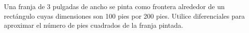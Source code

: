 \item Una franja de 3 pulgadas de ancho se pinta como frontera alrededor de un rectángulo cuyas dimensiones son 100 pies por 200 pies. Utilice diferenciales para aproximar el número de pies cuadrados de la franja pintada.
